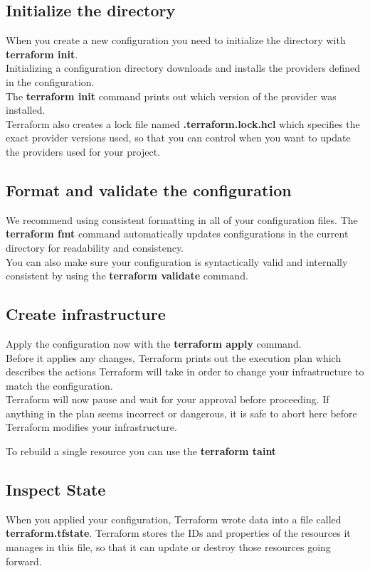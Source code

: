 \documentclass[12pt, letterpaper, twoside]{article}
\begin{document}
\subsection{Initialize the directory}
When you create a new configuration you need to initialize the directory with \textbf{terraform init}.\\
Initializing a configuration directory downloads and installs the providers defined in the configuration.\\
The \textbf{terraform init} command prints out which version of the provider was installed.\\
Terraform also creates a lock file named \textbf{.terraform.lock.hcl} which specifies 
the exact provider versions used, so that you can control when you want to update 
the providers used for your project.

\subsection{Format and validate the configuration}
We recommend using consistent formatting in all of your configuration files. 
The \textbf{terraform fmt} command automatically updates configurations in the 
current directory for readability and consistency.\\
You can also make sure your configuration is syntactically valid and internally 
consistent by using the \textbf{terraform validate} command.

\subsection{Create infrastructure}
Apply the configuration now with the \textbf{terraform apply} command.\\
Before it applies any changes, Terraform prints out the execution plan which describes 
the actions Terraform will take in order to change your infrastructure to match the configuration.\\
Terraform will now pause and wait for your approval before proceeding. 
If anything in the plan seems incorrect or dangerous, it is safe to abort here before 
Terraform modifies your infrastructure.

To rebuild a single resource you can use the \textbf{terraform taint}

\subsection{Inspect State}
When you applied your configuration, Terraform wrote data into a file called \textbf{terraform.tfstate}. 
Terraform stores the IDs and properties of the resources it manages in this file, 
so that it can update or destroy those resources going forward.
\end{document}
